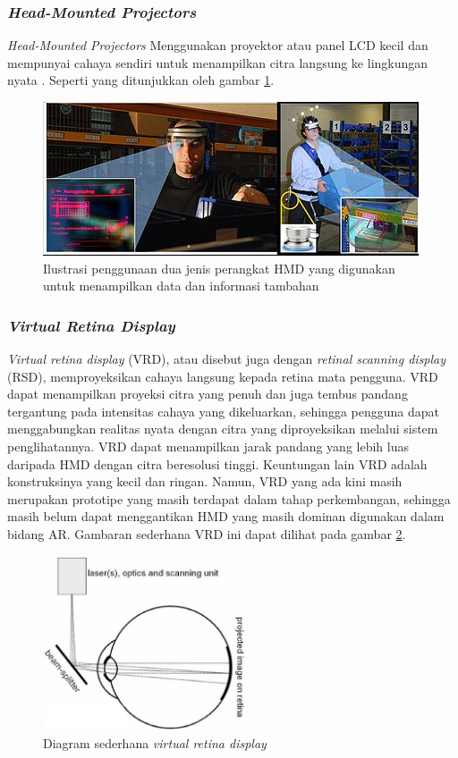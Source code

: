 \subsubsection {\textit{Head-Mounted Projectors}}
\label{subsubsec:HMDP}
\textit{Head-Mounted Projectors} Menggunakan proyektor atau panel LCD kecil dan mempunyai cahaya sendiri untuk menampilkan citra langsung ke lingkungan nyata \cite{Bimber2005}. Seperti yang ditunjukkan oleh gambar \ref{fig:hmpd}.

\begin{figure}[h]
\begin{center}
\includegraphics{./images/hmpd}
\caption {\label{fig:hmpd} Ilustrasi penggunaan dua jenis perangkat HMD yang digunakan untuk menampilkan data dan informasi tambahan}
\end{center}
\end{figure}

\subsubsection {\textit{Virtual Retina Display}}
\label{subsubsec:VRD}
\textit{Virtual retina display} (VRD), atau disebut juga dengan \textit{retinal scanning display} (RSD), memproyeksikan cahaya langsung kepada retina mata pengguna\cite{Haller2010}. VRD dapat menampilkan proyeksi citra yang penuh dan juga tembus pandang tergantung pada intensitas cahaya yang dikeluarkan, sehingga pengguna dapat menggabungkan realitas nyata dengan citra yang diproyeksikan  melalui sistem penglihatannya. VRD dapat menampilkan jarak pandang yang lebih luas daripada HMD dengan citra beresolusi tinggi\cite{Jacko2010}.  Keuntungan lain VRD adalah konstruksinya yang kecil dan ringan. Namun, VRD yang ada kini masih merupakan prototipe  yang masih terdapat dalam tahap perkembangan, sehingga masih belum dapat menggantikan HMD yang masih dominan digunakan dalam bidang AR. Gambaran sederhana VRD ini dapat dilihat pada gambar \ref{fig:VRD_diagram}.

\begin{figure}[h!]
	\centering
		\includegraphics[width=6cm]{images/virtual_retina_diagram}
	\caption{\label{fig:VRD_diagram} Diagram sederhana \textit{virtual retina display}}
\end{figure}

